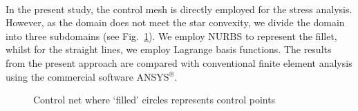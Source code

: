 \paragraph{}
In the present study, the control mesh is directly employed for the stress analysis.
However, as the domain does not meet the star convexity, we divide the domain into three subdomains (see Fig.~\ref{iso_fig:l_with_fillet_mesh}).
We employ NURBS to represent the fillet, whilst for the straight lines, we employ Lagrange basis functions.
The results from the present approach are compared with conventional finite element analysis using the commercial
    software ANSYS$^\circledR$.
    \begin{figure}[h!]
        \centering
        \caption{Control net where `filled' circles represents control points}
        \label{iso_fig:l_with_fillet_mesh}
    \end{figure}
%
